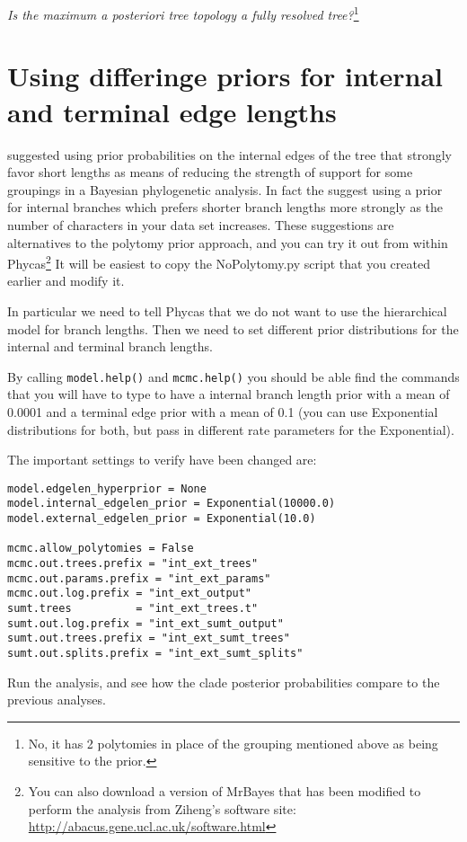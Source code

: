 \documentclass{article}
\newcommand{\cmd}[1]{\texttt{#1}\xspace}
\newcommand{\mb}{MrBayes\xspace}
\newcommand{\phycas}{Phycas\xspace}
\newcommand{\localfile}[1]{\textsf{#1}\xspace}
\newcommand{\QandA}[2]{\textit{#1}\footnote{#2}\xspace}
\begin{document}
\QandA{Is the maximum a posteriori tree topology a fully resolved tree?}{No, it has 2 polytomies in place of the grouping mentioned above as being sensitive to the prior.}
\section{Using differinge priors for internal and terminal edge lengths}
\citet{YangR2005} \citep[and][]{Yang2007} suggested using prior probabilities on the internal edges of the tree that strongly favor short lengths as means of reducing the strength
of support for some groupings in a Bayesian phylogenetic analysis.
In fact the suggest using a prior for internal branches which prefers shorter branch lengths more
strongly as the number of characters in your data set increases.
These suggestions are alternatives to the polytomy prior approach, and you can try it out from within 
\phycas\footnote{You can also download a version of \mb that has been modified to perform the analysis from Ziheng's software site: \url{http://abacus.gene.ucl.ac.uk/software.html}}
It will be easiest to copy the \localfile{NoPolytomy.py} script that you created earlier 
and modify it.

In particular we need to tell \phycas that we do not want to use the hierarchical model for
branch lengths.
Then we need to set different prior distributions for the internal and terminal branch lengths.

By calling \cmd{model.help()} and \cmd{mcmc.help()} you should be able find the commands that you will have to type to have a internal branch length prior with a mean of 0.0001 and a terminal edge prior with a mean of 0.1 (you can use Exponential distributions for both, but pass in different rate parameters for the Exponential).

The important settings to verify have been changed are:
\begin{verbatim}
model.edgelen_hyperprior = None
model.internal_edgelen_prior = Exponential(10000.0)
model.external_edgelen_prior = Exponential(10.0)

mcmc.allow_polytomies = False
mcmc.out.trees.prefix = "int_ext_trees"
mcmc.out.params.prefix = "int_ext_params"
mcmc.out.log.prefix = "int_ext_output"
sumt.trees          = "int_ext_trees.t"
sumt.out.log.prefix = "int_ext_sumt_output"
sumt.out.trees.prefix = "int_ext_sumt_trees"
sumt.out.splits.prefix = "int_ext_sumt_splits"
\end{verbatim}

Run the analysis, and see how the clade posterior probabilities compare to the previous analyses.
\end{document}
